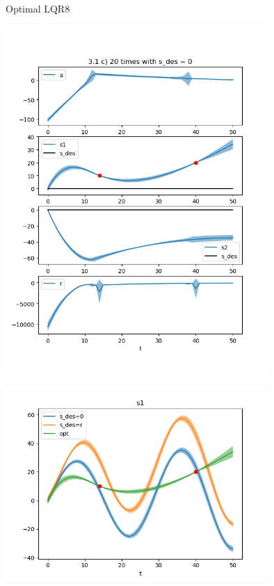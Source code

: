 \begin{questions}
\begin{question}{Optimal LQR}{8}
\begin{answer}
	\begin{center}
		\includegraphics[width=0.75\textwidth]{img/1c_1.png}
	\end{center}

	\begin{center}
		\includegraphics[width=0.75\textwidth]{img/1c_2.png}
	\end{center}


\end{answer}
\end{question}
\end{questions}
